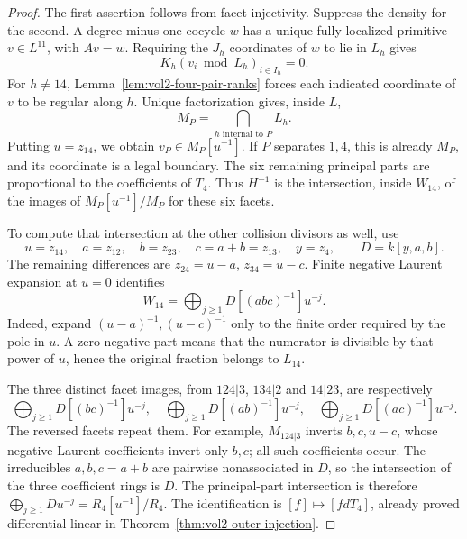 \begin{proof}
The first assertion follows from facet injectivity. Suppress
the density for the second. A degree-minus-one cocycle $w$ has
a unique fully localized primitive $v\in L^{11}$, with $Av=w$.
Requiring the $J_h$ coordinates of $w$ to lie in $L_h$ gives
\[
 K_h(v_i\bmod L_h)_{i\in I_h}=0.
\]
For $h\ne14$, Lemma~\ref{lem:vol2-four-pair-ranks} forces each
indicated coordinate of $v$ to be regular along $h$. Unique
factorization gives, inside $L$,
\[
 M_P=\bigcap_{h\text{ internal to }P}L_h.
\]
Putting $u=z_{14}$, we obtain $v_P\in M_P[u^{-1}]$.
If $P$ separates $1,4$, this is already $M_P$, and its
coordinate is a legal boundary. The six remaining principal
parts are proportional to the coefficients of $T_4$. Thus
$H^{-1}$ is the intersection, inside $W_{14}$, of the images
of $M_P[u^{-1}]/M_P$ for these six facets.

To compute that intersection at the other collision divisors
as well, use
\[
 u=z_{14},\quad a=z_{12},\quad b=z_{23},\quad
 c=a+b=z_{13},\quad y=z_4,
 \qquad D=k[y,a,b].
\]
The remaining differences are $z_{24}=u-a$, $z_{34}=u-c$.
Finite negative Laurent expansion at $u=0$ identifies
\[
 W_{14}=\bigoplus_{j\geq1}D[(abc)^{-1}]u^{-j}.
\]
Indeed, expand $(u-a)^{-1},(u-c)^{-1}$ only to the finite
order required by the pole in $u$. A zero negative part means
that the numerator is divisible by that power of $u$, hence
the original fraction belongs to $L_{14}$.

The three distinct facet images, from $124|3$, $134|2$ and
$14|23$, are respectively
\[
 \bigoplus_{j\geq1}D[(bc)^{-1}]u^{-j},\quad
 \bigoplus_{j\geq1}D[(ab)^{-1}]u^{-j},\quad
 \bigoplus_{j\geq1}D[(ac)^{-1}]u^{-j}.
\]
The reversed facets repeat them. For example, $M_{124|3}$
inverts $b,c,u-c$, whose negative Laurent coefficients invert
only $b,c$; all such coefficients occur. The irreducibles
$a,b,c=a+b$ are pairwise nonassociated in $D$, so the
intersection of the three coefficient rings is $D$.
The principal-part intersection is therefore
$\bigoplus_{j\geq1}Du^{-j}=R_4[u^{-1}]/R_4$.
The identification is $[f]\mapsto[fdT_4]$, already proved
differential-linear in Theorem~\ref{thm:vol2-outer-injection}.
\end{proof}

